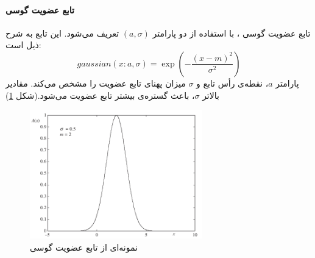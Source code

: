 \documentclass[12pt,a4paper]{article}
\theoremstyle{definition}
\begin{document}
\paragraph{تابع عضویت گوسی}
تابع عضویت گوسی
،
 با استفاده از دو پارامتر $(a, \sigma)$ تعریف می‌شود. این تابع به شرح ذیل است:
\begin{equation}\label{eq:e_fset_memfunc_gausi}
gaussian (x: a, \sigma) = \exp \left( - \frac{(x-m)^2}{\sigma^2} \right)
\end{equation}
پارامتر $a$، نقطه‌ی رأس تابع و $\sigma$ میزان پهنای تابع عضویت را مشخص می‌کند. مقادیر بالاتر $\sigma$، باعث گستره‌ی بیشتر تابع عضویت می‌شود.(شکل \ref{fig:f_16})
\cite{Pedrycz2007}
\begin{figure}[h]
	\centering 
	\includegraphics[width=75mm]{Images/Fig16.png}
	\vspace{-0.5cm}
	\caption{نمونه‌ای از تابع عضویت گوسی}\label{fig:f_16}
\end{figure}
\end{document}
